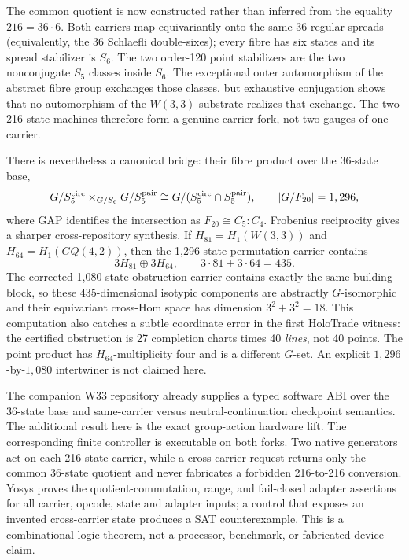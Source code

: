 \documentclass[11pt,letterpaper]{article}
\newcommand{\tagbox}[3]{\tikz[baseline=(X.base)]{\node[inner xsep=3.5pt,inner ysep=1.4pt,rounded corners=1.6pt,fill=#1,text=#2,font=\bfseries\sffamily\tiny] (X) {#3};}}
\newcommand{\PROVED}{\tagbox{greenlite}{green!45!black}{PROVED}}
\newcommand{\FORMAL}{\tagbox{cyanlite}{cyan!55!black}{FORMAL}}
\newcommand{\W}{\ensuremath{W(3,3)}}
\begin{document}
The common quotient is now constructed rather than inferred from the equality
$216=36\cdot6$.  Both carriers map equivariantly onto the same 36 regular
spreads (equivalently, the 36 Schlaefli double-sixes); every fibre has six
states and its spread stabilizer is $S_6$.  The two order-120 point
stabilizers are the two nonconjugate $S_5$ classes inside $S_6$.  The
exceptional outer automorphism of the abstract fibre group exchanges those
classes, but exhaustive conjugation shows that no automorphism of the
\W{} substrate realizes that exchange.  The two 216-state machines therefore
form a genuine carrier fork, not two gauges of one carrier. \PROVED

There is nevertheless a canonical bridge: their fibre product over the
36-state base,
\[
  G/S_5^{\rm circ}\times_{G/S_6}G/S_5^{\rm pair}
  \cong G/(S_5^{\rm circ}\cap S_5^{\rm pair}),
  \qquad |G/F_{20}|=1,296,
\]
where GAP identifies the intersection as $F_{20}\cong C_5{:}C_4$.
Frobenius reciprocity gives a sharper cross-repository synthesis.  If
$H_{81}=H_1(W(3,3))$ and $H_{64}=H_1(GQ(4,2))$, then the 1,296-state
permutation carrier contains
\[
  3H_{81}\oplus3H_{64},
  \qquad 3\cdot81+3\cdot64=435.
\]
The corrected 1,080-state obstruction carrier contains exactly the same
building block, so these 435-dimensional isotypic components are abstractly
$G$-isomorphic and their equivariant cross-Hom space has dimension
$3^2+3^2=18$.  This computation also catches a subtle coordinate error in the
first HoloTrade witness: the certified obstruction is 27 completion charts
times 40 \emph{lines}, not 40 points.  The point product has
$H_{64}$-multiplicity four and is a different $G$-set.  An explicit
$1,296$-by-$1,080$ intertwiner is not claimed here. \PROVED

The companion W33 repository already supplies a typed software ABI over the
36-state base and same-carrier versus neutral-continuation checkpoint semantics.
The additional result here is the exact group-action hardware lift.  The
corresponding finite controller is executable on both forks.
Two native generators act on each 216-state carrier, while a cross-carrier
request returns only the common 36-state quotient and never fabricates a
forbidden 216-to-216 conversion.  Yosys proves the quotient-commutation,
range, and fail-closed adapter assertions for all carrier, opcode, state and
adapter inputs; a control that exposes an invented cross-carrier state produces
a SAT counterexample.  This is a combinational logic theorem, not a processor,
benchmark, or fabricated-device claim. \FORMAL
\end{document}
